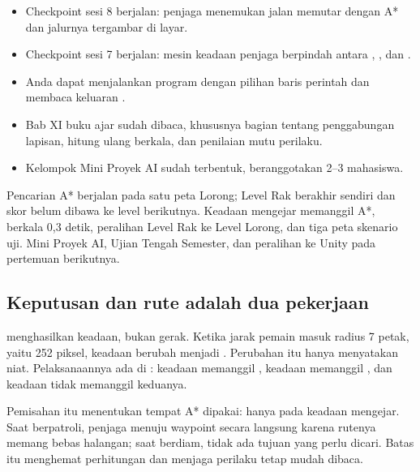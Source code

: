 
\begin{prasyaratbox}
\begin{itemize}[leftmargin=1.4em, itemsep=0.25em]
  \item Checkpoint sesi 8 berjalan: penjaga menemukan jalan memutar dengan
        A* dan jalurnya tergambar di layar.
  \item Checkpoint sesi 7 berjalan: mesin keadaan penjaga berpindah antara
        , , dan .
  \item Anda dapat menjalankan program dengan pilihan baris perintah dan
        membaca keluaran .
  \item Bab XI buku ajar sudah dibaca, khususnya bagian tentang penggabungan
        lapisan, hitung ulang berkala, dan penilaian mutu perilaku.
  \item Kelompok Mini Proyek AI sudah terbentuk, beranggotakan 2--3 mahasiswa.
\end{itemize}
\end{prasyaratbox}


\petasesi
  {Pencarian A* berjalan pada satu peta Lorong; Level Rak berakhir sendiri
   dan skor belum dibawa ke level berikutnya.}
  {Keadaan mengejar memanggil A*,  berkala 0,3 detik,
   peralihan Level Rak ke Level Lorong, dan tiga peta skenario uji.}
  {Mini Proyek AI, Ujian Tengah Semester, dan peralihan ke Unity pada
   pertemuan berikutnya.}


\subsection*{Keputusan dan rute adalah dua pekerjaan}

 menghasilkan keadaan, bukan gerak. Ketika jarak pemain
masuk radius 7 petak, yaitu 252 piksel, keadaan berubah menjadi
. Perubahan itu hanya menyatakan niat. Pelaksanaannya ada di
: keadaan  memanggil , keadaan
 memanggil , dan keadaan  tidak
memanggil keduanya.

Pemisahan itu menentukan tempat A* dipakai: hanya pada keadaan mengejar.
Saat berpatroli, penjaga menuju waypoint secara langsung karena rutenya
memang bebas halangan; saat berdiam, tidak ada tujuan yang perlu dicari.
Batas itu menghemat perhitungan dan menjaga perilaku tetap mudah dibaca.

